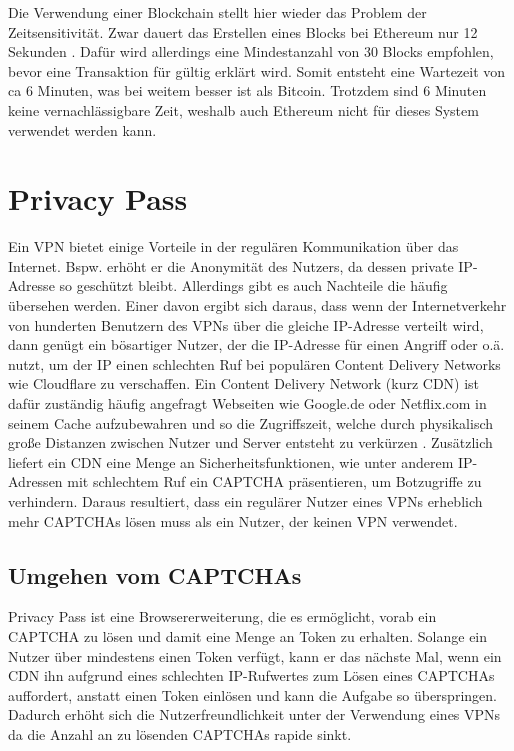 \documentclass[11pt,a4paper]{scrreprt}
\begin{document}
Die Verwendung einer Blockchain stellt hier wieder das Problem der Zeitsensitivität. Zwar dauert das Erstellen eines Blocks bei Ethereum nur 12 Sekunden \cite{eth-timePerBlock}. Dafür wird allerdings eine Mindestanzahl von 30 Blocks empfohlen, bevor eine Transaktion für gültig erklärt wird. Somit entsteht eine Wartezeit von ca 6 Minuten, was bei weitem besser ist als Bitcoin. Trotzdem sind 6 Minuten keine vernachlässigbare Zeit, weshalb auch Ethereum nicht für dieses System verwendet werden kann.


\section{Privacy Pass}
\label{sec:privacy-pass}
Ein VPN bietet einige Vorteile in der regulären Kommunikation über das Internet. Bspw. erhöht er die Anonymität des Nutzers, da dessen private IP-Adresse so geschützt bleibt. Allerdings gibt es auch Nachteile die häufig übersehen werden. Einer davon ergibt sich daraus, dass wenn der Internetverkehr von hunderten Benutzern des VPNs über die gleiche IP-Adresse verteilt wird, dann genügt ein bösartiger Nutzer, der die IP-Adresse für einen Angriff oder o.ä. nutzt, um der IP einen schlechten Ruf bei populären Content Delivery Networks wie Cloudflare zu verschaffen. Ein Content Delivery Network (kurz CDN) ist dafür zuständig häufig angefragt Webseiten wie Google.de oder Netflix.com in seinem Cache aufzubewahren und so die Zugriffszeit, welche durch physikalisch große Distanzen zwischen Nutzer und Server entsteht zu verkürzen \cite{pp-cdn}. Zusätzlich liefert ein CDN eine Menge an Sicherheitsfunktionen, wie unter anderem IP-Adressen mit schlechtem Ruf ein CAPTCHA präsentieren, um Botzugriffe zu verhindern. Daraus resultiert, dass ein regulärer Nutzer eines VPNs erheblich mehr CAPTCHAs lösen muss als ein Nutzer, der keinen VPN verwendet.

\subsection{Umgehen vom CAPTCHAs}
Privacy Pass ist eine Browsererweiterung, die es ermöglicht, vorab ein CAPTCHA zu lösen und damit eine Menge an Token zu erhalten. Solange ein Nutzer über mindestens einen Token verfügt, kann er das nächste Mal, wenn ein CDN ihn aufgrund eines schlechten IP-Rufwertes zum Lösen eines CAPTCHAs auffordert, anstatt einen Token einlösen und kann die Aufgabe so überspringen. Dadurch erhöht sich die Nutzerfreundlichkeit unter der Verwendung eines VPNs da die Anzahl an zu lösenden CAPTCHAs rapide sinkt. \cite{pp-davidson2018privacy}
\end{document}
